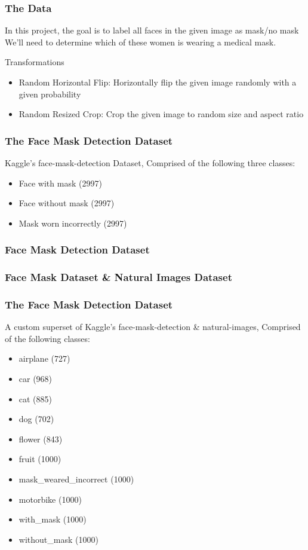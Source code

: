 \begin{frame}
    \frametitle{The Data}
    In this project, the goal is to label all faces in the given image as mask/no mask
    We'll need to determine which of these women is wearing a \alert{medical mask}.

    \begin{block}{Transformations}
        \begin{itemize}
            \item Random Horizontal Flip: Horizontally flip the given image randomly with a given probability
            \item Random Resized Crop: Crop the given image to random size and aspect ratio
        \end{itemize}
    \end{block}
\end{frame}

\begin{frame}
    \frametitle{The Face Mask Detection Dataset}
    Kaggle's face-mask-detection Dataset, Comprised of the following three classes:
        \begin{itemize}
            \item Face with mask (2997)
            \item Face without mask (2997)
            \item Mask worn incorrectly (2997)
        \end{itemize}
\end{frame}


\subsubsection{ \label{secondModel} Face Mask Detection Dataset \cite{face-mask-detection}}
    \subsubsection{\label{firstModel} Face Mask Dataset \cite{face-mask-detection} \&  Natural Images Dataset \cite{natural-images}}
\begin{frame}
    \frametitle{The Face Mask Detection Dataset}
        A custom superset of Kaggle's face-mask-detection \& natural-images, Comprised of the following classes:
        \begin{itemize}
            \item airplane (727)
            \item car (968)
            \item cat (885)
            \item dog (702)
            \item flower (843)
            \item fruit (1000)
            \item mask\_weared\_incorrect (1000)
            \item motorbike (1000)
            \item with\_mask (1000)
            \item without\_mask (1000)
        \end{itemize}
\end{frame}
